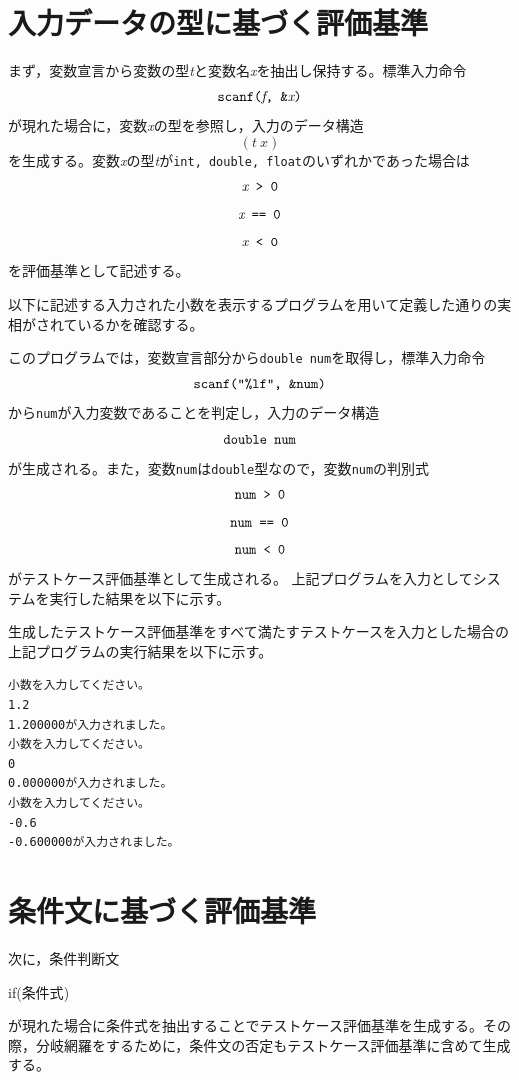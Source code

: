 \documentclass{tpu-sotu}
\begin{document}
\section{入力データの型に基づく評価基準}
まず，変数宣言から変数の型{\it t}と変数名{\it x}を抽出し保持する。標準入力命令\\
\[ 
\mbox{{\tt {scanf({\it f}, \&{\it x})}}}
\]
が現れた場合に，変数{\it x}の型を参照し，入力のデータ構造\\
\[
(t\:x)
\]
を生成する。変数{\it x}の型{\it t}が{\tt int, double, float}のいずれかであった場合は\\
\[ 
\mbox{\tt{{\it x} > 0}} 
\]
\[
\mbox{\tt{{\it x} == 0}}
\]
\[
\mbox{\tt{{\it x} < 0}}
\]
を評価基準として記述する。

以下に記述する入力された小数を表示するプログラムを用いて定義した通りの実相がされているかを確認する。

このプログラムでは，変数宣言部分から{\tt double num}を取得し，標準入力命令\\
\[ 
\mbox{{\tt {scanf("\%lf", \&num)}}}
\]
から{\tt num}が入力変数であることを判定し，入力のデータ構造\\
\[
\mbox{{\tt double num}}
\]
が生成される。また，変数{\tt num}は{\tt double}型なので，変数{\tt num}の判別式\\
\[ 
\mbox{\tt{num > 0}} 
\]
\[
\mbox{\tt{num == 0}}
\]
\[
\mbox{\tt{num < 0}}
\]
がテストケース評価基準として生成される。
上記プログラムを入力としてシステムを実行した結果を以下に示す。

生成したテストケース評価基準をすべて満たすテストケースを入力とした場合の上記プログラムの実行結果を以下に示す。
\begin{lstlisting}[xleftmargin=1cm]
小数を入力してください。
1.2
1.200000が入力されました。
小数を入力してください。
0
0.000000が入力されました。
小数を入力してください。
-0.6
-0.600000が入力されました。
\end{lstlisting}

\section{条件文に基づく評価基準}
次に，条件判断文\\
{\tt \centerline {if({条件式})}}
が現れた場合に条件式を抽出することでテストケース評価基準を生成する。その際，分岐網羅をするために，条件文の否定もテストケース評価基準に含めて生成する。
\end{document}
